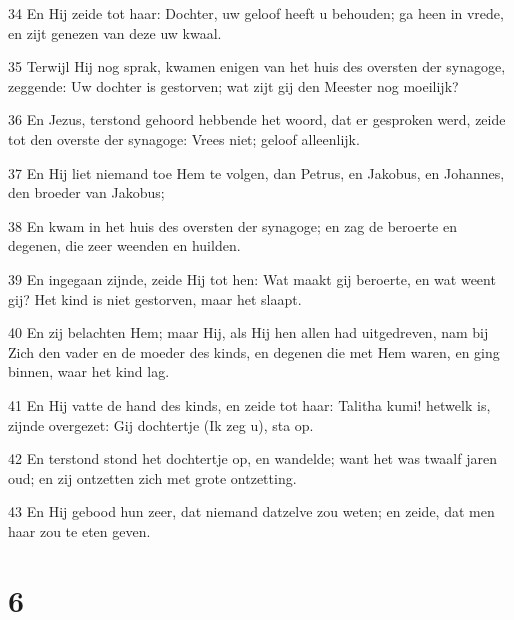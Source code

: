 \par 34 En Hij zeide tot haar: Dochter, uw geloof heeft u behouden; ga heen in vrede, en zijt genezen van deze uw kwaal.
\par 35 Terwijl Hij nog sprak, kwamen enigen van het huis des oversten der synagoge, zeggende: Uw dochter is gestorven; wat zijt gij den Meester nog moeilijk?
\par 36 En Jezus, terstond gehoord hebbende het woord, dat er gesproken werd, zeide tot den overste der synagoge: Vrees niet; geloof alleenlijk.
\par 37 En Hij liet niemand toe Hem te volgen, dan Petrus, en Jakobus, en Johannes, den broeder van Jakobus;
\par 38 En kwam in het huis des oversten der synagoge; en zag de beroerte en degenen, die zeer weenden en huilden.
\par 39 En ingegaan zijnde, zeide Hij tot hen: Wat maakt gij beroerte, en wat weent gij? Het kind is niet gestorven, maar het slaapt.
\par 40 En zij belachten Hem; maar Hij, als Hij hen allen had uitgedreven, nam bij Zich den vader en de moeder des kinds, en degenen die met Hem waren, en ging binnen, waar het kind lag.
\par 41 En Hij vatte de hand des kinds, en zeide tot haar: Talitha kumi! hetwelk is, zijnde overgezet: Gij dochtertje (Ik zeg u), sta op.
\par 42 En terstond stond het dochtertje op, en wandelde; want het was twaalf jaren oud; en zij ontzetten zich met grote ontzetting.
\par 43 En Hij gebood hun zeer, dat niemand datzelve zou weten; en zeide, dat men haar zou te eten geven.

\chapter{6}

